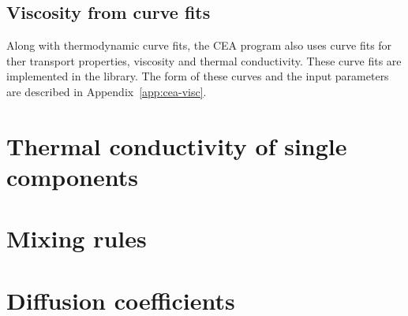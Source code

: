 \subsection{Viscosity from curve fits}
Along with thermodynamic curve fits, the CEA program also uses curve fits
for ther transport properties, viscosity and thermal conductivity.
These curve fits are implemented in the library.
The form of these curves and the input parameters are
described in Appendix~\ref{app:cea-visc}.

\section{Thermal conductivity of single components}



\section{Mixing rules}

\section{Diffusion coefficients}


